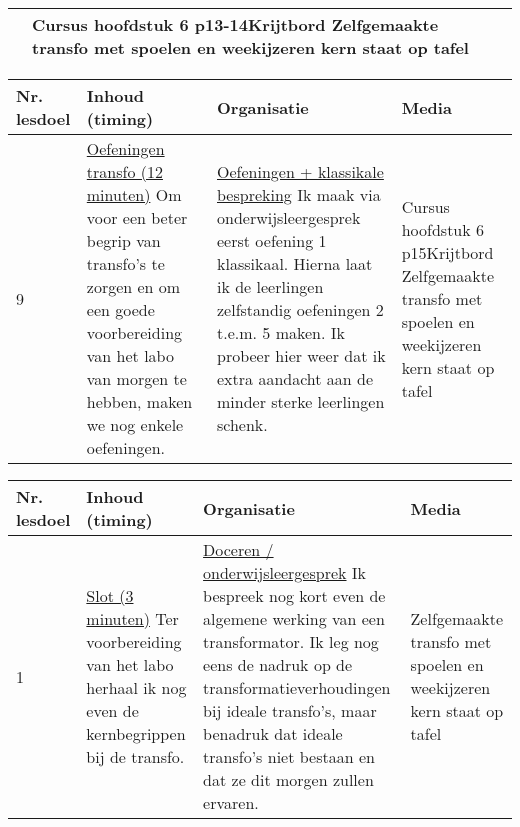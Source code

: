 \begin{landscape}
\begin{tabularx}{1.56\textwidth}{|p{1.5cm}|p{8cm}|X|p{4cm}|}
	&   Cursus hoofdstuk 6 p13-14\newline\newline Krijtbord \newline\newline Zelfgemaakte transfo met spoelen en weekijzeren kern staat op tafel
	\\ \hline
	\end{tabularx}\vspace{5mm}

		\begin{tabularx}{1.56\textwidth}{|p{1.5cm}|p{8cm}|X|p{4cm}|}
		\hline
		\textbf{Nr. lesdoel } & \textbf{Inhoud (timing)}  & \textbf{Organisatie } & \textbf{Media } \\ \hline
		9\newline 10&\underline{Oefeningen transfo (12 minuten)}\newline
		Om voor een beter begrip van transfo's te zorgen en om een goede voorbereiding van het labo van morgen te hebben, maken we nog enkele oefeningen.
		&  \underline{Oefeningen + klassikale bespreking}\newline 
		Ik maak via onderwijsleergesprek eerst oefening 1 klassikaal. Hierna laat ik de leerlingen zelfstandig oefeningen 2 t.e.m. 5 maken. Ik probeer hier weer dat ik extra aandacht aan de minder sterke leerlingen schenk.
		&   Cursus hoofdstuk 6 p15\newline\newline Krijtbord \newline\newline Zelfgemaakte transfo met spoelen en weekijzeren kern staat op tafel
		\\ \hline
	\end{tabularx}\vspace{5mm}

\begin{tabularx}{1.56\textwidth}{|p{1.5cm}|p{8cm}|X|p{4cm}|}
	\hline
	\textbf{Nr. lesdoel } & \textbf{Inhoud (timing)}  & \textbf{Organisatie } & \textbf{Media } \\ \hline
	1&\underline{Slot (3 minuten)}\newline
	Ter voorbereiding van het labo herhaal ik nog even de kernbegrippen bij de transfo.
	&  \underline{Doceren / onderwijsleergesprek}\newline 
	Ik bespreek nog kort even de algemene werking van een transformator. Ik leg nog eens de nadruk op de transformatieverhoudingen bij ideale transfo's, maar benadruk dat ideale transfo's niet bestaan en dat ze dit morgen zullen ervaren.
	& Zelfgemaakte transfo met spoelen en weekijzeren kern staat op tafel
	\\ \hline
\end{tabularx}\vspace{5mm}

	
\end{landscape}


